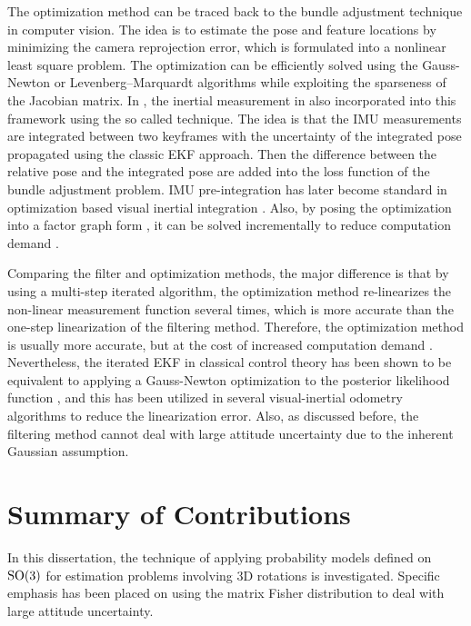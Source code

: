 The optimization method can be traced back to the bundle adjustment technique \cite{triggs1999bundle} in computer vision.
The idea is to estimate the pose and feature locations by minimizing the camera reprojection error, which is formulated into a nonlinear least square problem.
The optimization can be efficiently solved using the Gauss-Newton or Levenberg–Marquardt algorithms while exploiting the sparseness of the Jacobian matrix.
In \cite{forster2016manifold,lupton2011visual}, the inertial measurement in also incorporated into this framework using the so called  technique.
The idea is that the IMU measurements are integrated between two keyframes with the uncertainty of the integrated pose propagated using the classic EKF approach.
Then the difference between the relative pose and the integrated pose are added into the loss function of the bundle adjustment problem.
IMU pre-integration has later become standard in optimization based visual inertial integration \cite{brossard2021associating,mur2017visual,qin2018vins}.
Also, by posing the optimization into a factor graph form \cite{indelman2013information}, it can be solved incrementally to reduce computation demand \cite{kaess2012isam2}.

Comparing the filter and optimization methods, the major difference is that by using a multi-step iterated algorithm, the optimization method re-linearizes the non-linear measurement function several times, which is more accurate than the one-step linearization of the filtering method.
Therefore, the optimization method is usually more accurate, but at the cost of increased computation demand \cite{huang2019visual}.
Nevertheless, the iterated EKF in classical control theory has been shown to be equivalent to applying a Gauss-Newton optimization to the posterior likelihood function \cite{bell1993iterated}, and this has been utilized in several visual-inertial odometry algorithms \cite{bloesch2017iterated,bloesch2015robust} to reduce the linearization error.
Also, as discussed before, the filtering method cannot deal with large attitude uncertainty due to the inherent Gaussian assumption.

\section{Summary of Contributions}

In this dissertation, the technique of applying probability models defined on $\mathrm{SO}(3)$ for estimation problems involving 3D rotations is investigated.
Specific emphasis has been placed on using the matrix Fisher distribution to deal with large attitude uncertainty.

